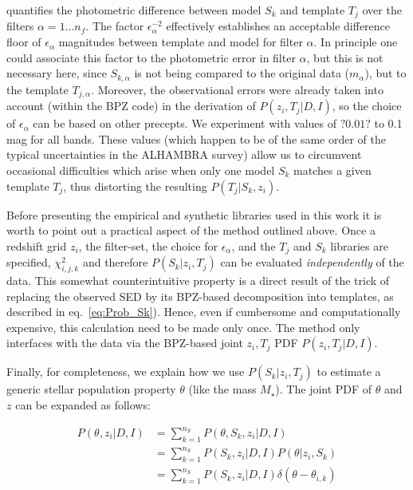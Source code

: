\documentclass[a4paper, useAMS, usenatbib, hyperpdf]{mn2e}
\begin{document}
\noindent quantifies the photometric difference between model $S_k$ and template $T_j$ over the filters $\alpha = 1\ldots n_f$. The factor $\epsilon_\alpha^{-2}$ effectively establishes an acceptable difference floor of $\epsilon_\alpha$ magnitudes between template and model for filter $\alpha$. In principle one could associate this factor to the photometric error in filter $\alpha$, but this is not necessary here, since $S_{k,\alpha}$ is not being compared to the original data ($m_\alpha$), but to the template $T_{j,\alpha}$. Moreover, the observational errors were already taken into account (within the BPZ code) in the derivation of $P(z_i,T_j | D,I)$, so the choice of $\epsilon_\alpha$ can be based on other precepts. We experiment with values of $?0.01?$ to 0.1 mag for all bands. These values (which happen to be of the same order of the typical uncertainties in the ALHAMBRA survey) allow us to circumvent occasional difficulties which arise when only one model $S_k$ matches a given template $T_j$, thus distorting the resulting $P(T_j | S_k, z_i)$.


Before presenting the empirical and synthetic libraries used in this work it is worth to point out a practical aspect of the method outlined above. Once a redshift grid $z_i$, the filter-set, the choice for $\epsilon_\alpha$, and the $T_j$ and $S_k$ libraries are specified, $\chi^2_{i, j, k}$ and therefore $P(S_k | z_i,T_j)$ can be evaluated {\it independently} of the data. This somewhat counterintuitive property is a direct result of the trick of replacing the observed SED by its BPZ-based decomposition into templates, as described in eq.\ \ref{eq:Prob_Sk}). Hence, even if cumbersome and computationally expensive, this calculation need to be made only once. The method only interfaces with the data via the BPZ-based joint $z_i,T_j$ PDF $P(z_i,T_j | D,I)$.


Finally, for completeness, we explain how we use $P(S_k | z_i,T_j)$ to estimate a generic stellar population property $\theta$ (like the mass 
$M_\star$). The joint PDF of $\theta$ and $z$ can be expanded as follows:


\begin{equation}
\label{eq:Prob_theta}
\begin{split}
P(\theta , z_i | D , I) & =  \sum_{k=1}^{n_S} P(\theta , S_k , z_i  | D , I) \\
& =  \sum_{k=1}^{n_S} P( S_k ,  z_i | D , I) P(\theta | z_i , S_k) \\
& =  \sum_{k=1}^{n_S} P( S_k ,  z_i | D , I) \delta(\theta - \theta_{i,k})
\end{split}
\end{equation}
\end{document}

